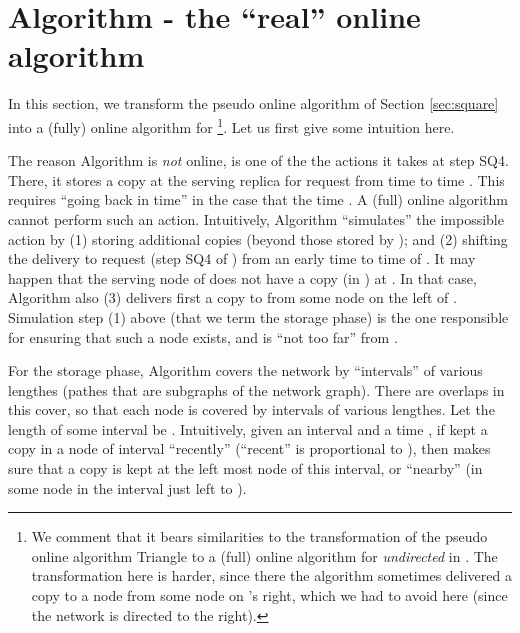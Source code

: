 \documentclass[11pt]{article}
\begin{document}
\AppSquareThm






\section{Algorithm  - the ``real'' online algorithm}
\label{subsec: Algorithm Donline}








In this section, we transform the pseudo online algorithm  of Section \ref{sec:square} into a (fully) online algorithm   for \footnote{
We comment that it bears similarities to the transformation of the pseudo online algorithm Triangle to a (full) online algorithm for {\em undirected}  in \cite{KK2014}. The transformation here is harder, since there the algorithm sometimes delivered a copy to a node  from some node on 's right, which we had to avoid here (since the network is directed to the right).
}.
Let us first give some intuition here.

The reason Algorithm  is {\em not} online, is one of the the actions it takes at step SQ4.
There, it stores a copy at the serving replica   for request  from time  to time .
This requires ``going back in time'' in the case that the time .
A (full) online algorithm cannot perform such an action.
Intuitively, Algorithm  ``simulates'' the impossible action by
(1) storing additional copies (beyond those stored by ); and
(2) shifting the delivery to request  (step SQ4 of ) from an early time to time  of .
It may happen that the serving node  of  does not have a copy (in ) at .
In that case, Algorithm  also (3)
delivers first a copy to  from some node  on the left of .
Simulation step (1) above (that we term the storage phase) is the one responsible for ensuring that such a node  exists, and is ``not too far'' from .

For the storage phase, Algorithm  covers the network by ``intervals'' of various lengthes (pathes that are subgraphs of the network graph).
There are overlaps in this cover, so that each node is covered by intervals of various lengthes.
Let the length of some interval  be .
Intuitively, given an interval  and a time ,
if  kept a copy in a node of interval  ``recently'' (``recent'' is proportional to ),
then  makes sure that a copy is kept at the left most node of this interval, or ``nearby''
(in some node in the interval just left to ).
\end{document}
